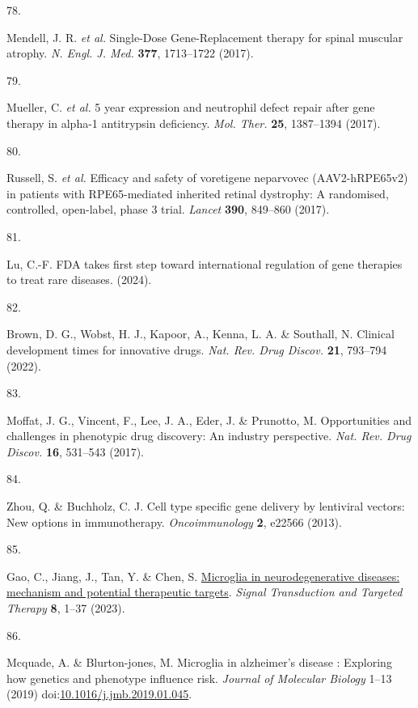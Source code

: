 \documentclass[
]{article}
\newlength{\cslhangindent}
\newlength{\csllabelwidth}
\newenvironment{CSLReferences}[2] %
 {\begin{list}{}{%
  \setlength{\itemindent}{0pt}
  \setlength{\leftmargin}{0pt}
  \setlength{\parsep}{0pt}
  \ifodd #1
   \setlength{\leftmargin}{\cslhangindent}
   \setlength{\itemindent}{-1\cslhangindent}
  \fi
  \setlength{\itemsep}{#2\baselineskip}}}
 {\end{list}}
\newcommand{\CSLLeftMargin}[1]{\parbox[t]{\csllabelwidth}{\strut#1\strut}}
\newcommand{\CSLRightInline}[1]{\parbox[t]{\linewidth - \csllabelwidth}{\strut#1\strut}}
\begin{document}
\begin{CSLReferences}{0}{0}
\CSLLeftMargin{78. }%
\CSLRightInline{Mendell, J. R. \emph{et al.} {Single-Dose}
{Gene-Replacement} therapy for spinal muscular atrophy. \emph{N. Engl.
J. Med.} \textbf{377}, 1713--1722 (2017).}

\CSLLeftMargin{79. }%
\CSLRightInline{Mueller, C. \emph{et al.} 5 year expression and
neutrophil defect repair after gene therapy in alpha-1 antitrypsin
deficiency. \emph{Mol. Ther.} \textbf{25}, 1387--1394 (2017).}

\CSLLeftMargin{80. }%
\CSLRightInline{Russell, S. \emph{et al.} Efficacy and safety of
voretigene neparvovec ({AAV2-hRPE65v2}) in patients with
{RPE65-mediated} inherited retinal dystrophy: A randomised, controlled,
open-label, phase 3 trial. \emph{Lancet} \textbf{390}, 849--860 (2017).}

\CSLLeftMargin{81. }%
\CSLRightInline{Lu, C.-F. {FDA} takes first step toward international
regulation of gene therapies to treat rare diseases. (2024).}

\CSLLeftMargin{82. }%
\CSLRightInline{Brown, D. G., Wobst, H. J., Kapoor, A., Kenna, L. A. \&
Southall, N. Clinical development times for innovative drugs. \emph{Nat.
Rev. Drug Discov.} \textbf{21}, 793--794 (2022).}

\CSLLeftMargin{83. }%
\CSLRightInline{Moffat, J. G., Vincent, F., Lee, J. A., Eder, J. \&
Prunotto, M. Opportunities and challenges in phenotypic drug discovery:
An industry perspective. \emph{Nat. Rev. Drug Discov.} \textbf{16},
531--543 (2017).}

\CSLLeftMargin{84. }%
\CSLRightInline{Zhou, Q. \& Buchholz, C. J. Cell type specific gene
delivery by lentiviral vectors: New options in immunotherapy.
\emph{Oncoimmunology} \textbf{2}, e22566 (2013).}

\CSLLeftMargin{85. }%
\CSLRightInline{Gao, C., Jiang, J., Tan, Y. \& Chen, S.
\href{https://doi.org/10.1038/s41392-023-01588-0}{Microglia in
neurodegenerative diseases: mechanism and potential therapeutic
targets}. \emph{Signal Transduction and Targeted Therapy} \textbf{8},
1--37 (2023).}

\CSLLeftMargin{86. }%
\CSLRightInline{Mcquade, A. \& Blurton-jones, M. Microglia in
alzheimer's disease : Exploring how genetics and phenotype influence
risk. \emph{Journal of Molecular Biology} 1--13 (2019)
doi:\href{https://doi.org/10.1016/j.jmb.2019.01.045}{10.1016/j.jmb.2019.01.045}.}


\end{CSLReferences}
\end{document}
